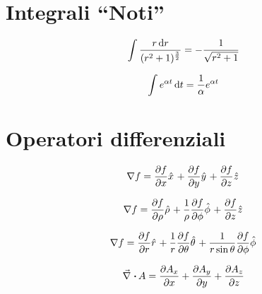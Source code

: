 \documentclass[a4paper,10pt]{article}
\begin{document}
\begin{multicols}{2}


\section{Integrali ``Noti''}
\begin{equation*}
  \int \frac{r \,\mathrm d r}{(r^2+1)^{\frac{3}{2}}} = - \frac{1}{\sqrt{r^2 + 1}}
\end{equation*}

\begin{equation*}
  \int e^{\alpha t} \,\mathrm d t = \frac{1}{\alpha} e^{\alpha t}
\end{equation*}

\section{Operatori differenziali}

  \begin{equation*}
    \grad f = \dep{f}{x} \hat{x} +
    \dep{f}{y} \hat{y} +
    \dep{f}{z} \hat{z}
  \end{equation*}
  
  \begin{equation*}
    \grad f = \dep{f}{\rho} \hat{\rho} +
    \frac{1}{\rho} \dep{f}{\phi} \hat{\phi} +
    \dep{f}{z} \hat{z}
  \end{equation*}
  
  \begin{equation*}
    \grad f = \dep{f}{r} \hat{r} +
    \frac{1}{r} \dep{f}{\theta} \hat{\theta} +
    \frac{1}{r \sin \theta} \dep{f}{\phi} \hat{\phi}
  \end{equation*}
  
  \begin{equation*}
    \div A = \dep{A_x}{x} + \dep{A_y}{y} + \dep{A_z}{z}
  \end{equation*}
  

\end{multicols}
\end{document}
